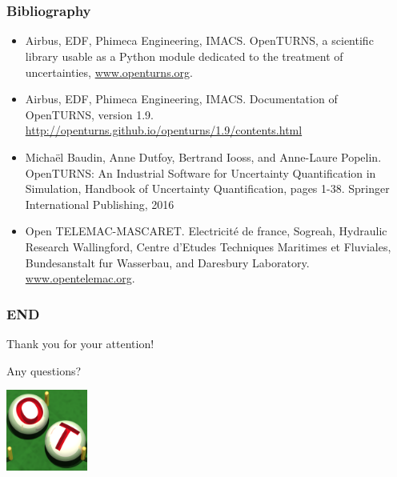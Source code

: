 \documentclass{beamer}
\begin{document}
\section{}

\begin{frame}
\frametitle{Bibliography}

\begin{itemize}
\item Airbus, EDF, Phimeca Engineering, IMACS. 
OpenTURNS, a scientific library usable as a Python module dedicated to the treatment of uncertainties, 
\url{www.openturns.org}.
\item Airbus, EDF, Phimeca Engineering, IMACS. Documentation of OpenTURNS, version 1.9. 
\url{http://openturns.github.io/openturns/1.9/contents.html}
\item  Michaël Baudin, Anne Dutfoy, Bertrand Iooss, and Anne-Laure Popelin. 
OpenTURNS: An Industrial Software for Uncertainty Quantification in Simulation, 
Handbook of Uncertainty Quantification, 
pages 1-38. Springer International Publishing, 2016
\item Open TELEMAC-MASCARET. 
Electricité de france, Sogreah, Hydraulic Research Wallingford, 
Centre d'Etudes Techniques Maritimes et Fluviales, Bundesanstalt fur Wasserbau, and Daresbury Laboratory.
\url{www.opentelemac.org}.
\end{itemize}

\end{frame}



\begin{frame}
\frametitle{END}

Thank you for your attention!

Any questions?

\begin{center}
\includegraphics[width=0.2\textwidth]{figures/logo-ot-small}
\end{center}

\end{frame}
\end{document}
